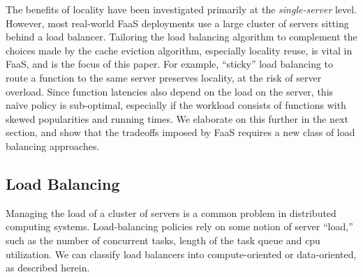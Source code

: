 The benefits of locality have been investigated primarily at the \emph{single-server} level.
However, most real-world FaaS deployments use a large cluster of servers sitting behind a load balancer.
Tailoring the load balancing algorithm to complement the choices made by the cache eviction algorithm, especially locality reuse, is vital in FaaS, and is the focus of this paper.
For example, ``sticky'' load balancing to route a function to the same server preserves locality, at the risk of server overload.
Since function latencies also depend on the load on the server, this na\"ive policy is sub-optimal, especially if the workload consists of functions with skewed popularities and running times.
We elaborate on this further in the next section, and show that the tradeoffs imposed by FaaS requires a new class of load balancing approaches. 









\subsection{Load Balancing}
Managing the load of a cluster of servers is a common problem in distributed computing systems.
Load-balancing policies rely on some notion of server ``load,'' such as the number of concurrent tasks, length of the task queue and cpu utilization.
%
We can classify load balancers into compute-oriented or data-oriented, as described herein.

